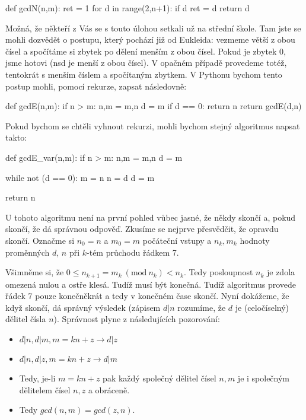 \begin{python}
def gcdN(n,m):
    ret = 1
    for d in range(2,n+1):
        if d %
            ret = d
    return d
\end{python}

Možná, že někteří z Vás se s touto úlohou setkali už na střední škole. Tam jste se mohli dozvědět o postupu, který 
pochází již od Eukleida: vezmeme větší z obou čísel a spočítáme si zbytek po dělení menším z obou čísel. Pokud je
zbytek 0, jsme hotovi (nsd je menší z obou čísel). V opačném případě provedeme totéž, tentokrát s menším číslem 
a spočítaným zbytkem. V Pythonu bychom tento postup mohli, pomocí rekurze, zapsat následovně:

\begin{python}
def gcdE(n,m):
    if n > m:
        n,m = m,n
    d = m %
    if d == 0:
        return n
    return gcdE(d,n)
\end{python}

Pokud bychom se chtěli vyhnout rekurzi, mohli bychom stejný algoritmus napsat takto:

\begin{python}
def gcdE_var(n,m):
    if n > m:
        n,m = m,n
    d = m %

    while not (d == 0):
      m = n
      n = d
      d = m %

    return n
\end{python}

U tohoto algoritmu není na první pohled vůbec jasné, že někdy skončí a, pokud skončí, že dá správnou odpověď.
Zkusíme se nejprve přesvědčit, že opravdu skončí. Označme si $n_0 = n$ a $m_0=m$ počáteční vstupy a $n_k, m_k$ hodnoty proměnných 
$d$, $n$ při $k$-tém průchodu řádkem 7. 

Všimněme si, že $0\leq n_{k+1} = m_k\ (\mbox{mod}\ n_k) <n_k$. Tedy posloupnost $n_k$ je zdola omezená
nulou a ostře klesá. Tudíž musí být konečná. Tudíž algoritmus provede řádek 7 pouze konečněkrát a tedy v konečném
čase skončí. Nyní dokážeme, že když skončí, dá správný výsledek (zápisem $d|n$ rozumíme, že $d$ je (celočíselný) dělitel čísla $n$). Správnost
plyne z následujících pozorování:

\begin{itemize}
 \item $d|n, d|m, m = kn + z \rightarrow d|z$
 \item $d|n, d|z, m = kn + z \rightarrow d|m$
 \item Tedy, je-li $m = kn + z$ pak každý společný dělitel čísel $n,m$ je i společným dělitelem čísel $n,z$ a obráceně.
 \item Tedy $gcd(n,m) = gcd(z,n)$.
\end{itemize}

